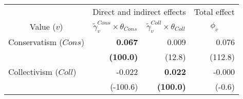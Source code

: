 
\begin{tabular}{lrrr}
\toprule
\multicolumn{1}{c}{ } & \multicolumn{2}{c}{Direct and indirect effects} & \multicolumn{1}{c}{Total effect} \\
\cmidrule(l{3pt}r{3pt}){2-3} \cmidrule(l{3pt}r{3pt}){4-4}
\multicolumn{1}{c}{Value ($v$)} & \multicolumn{1}{c}{$\widetilde{\gamma}^{Cons}_v \times \theta_{Cons}$} & \multicolumn{1}{c}{$\widetilde{\gamma}^{Coll}_v \times \theta_{Coll}$} & \multicolumn{1}{c}{${\phi}_v$}\\
\midrule
Conservatism ($Cons$) & \textbf{0.067} & 0.009 & 0.076\\
 & \textbf{(100.0)} & (12.8) & (112.8)\\
Collectivism ($Coll$) & -0.022 & \textbf{0.022} & -0.000\\
 & (-100.6) & \textbf{(100.0)} & (-0.6)\\
\bottomrule
\end{tabular}
